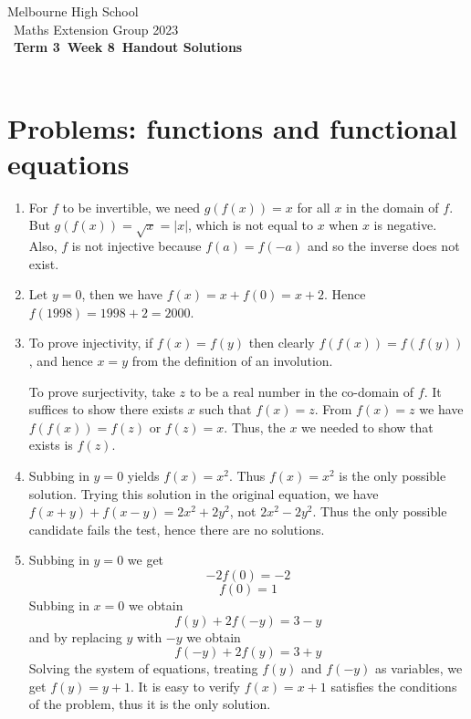 \documentclass[a4paper]{article}
\title{{\thepdftitle}}
\author{Nathan Wong\and Tom Yan}
\date{2023}
\newcommand{\theterm}{3}
\newcommand{\theweek}{8}
\newcommand{\thedisplaytitle}{Term \theterm\ Week \theweek\ Handout Solutions}
\begin{document}
\noindent Melbourne High School\\\
\noindent Maths Extension Group 2023\\\
\noindent \textbf{\thedisplaytitle}\\\
\section*{Problems: functions and functional equations}
\begin{enumerate}
\item For $f$ to be invertible, we need $g(f(x))=x$ for all $x$ in the domain of $f$. But $g(f(x))=\sqrt{x}=|x|$, which is not equal to $x$ when $x$ is negative. Also, $f$ is not injective because $f(a)=f(-a)$ and so the inverse does not exist.
\item Let $y=0$, then we have $f(x)=x+f(0)=x+2$. Hence $f(1998)=1998+2=2000$.
\item To prove injectivity, if $f(x)=f(y)$ then clearly $f(f(x))=f(f(y))$, and hence $x=y$ from the definition of an involution. 

 To prove surjectivity, take $z$ to be a real number in the co-domain of $f$. It suffices to show there exists $x$ such that $f(x)=z$. From $f(x)=z$ we have $f(f(x))=f(z)$ or $f(z)=x$. Thus, the $x$ we needed to show that exists is $f(z)$.
\item Subbing in $y=0$ yields $f(x)=x^2$. Thus $f(x)=x^2$ is the only possible solution. Trying this solution in the original equation, we have $f(x+y)+f(x-y)=2x^2+2y^2$, not $2x^2-2y^2$. Thus the only possible candidate fails the test, hence there are no solutions.
\item Subbing in $y=0$ we get $$-2f(0)=-2$$ $$f(0)=1$$ Subbing in $x=0$ we obtain $$f(y)+2f(-y)=3-y$$ and by replacing $y$ with $-y$ we obtain $$f(-y)+2f(y)=3+y$$ Solving the system of equations, treating $f(y)$ and $f(-y)$ as variables, we get $f(y)=y+1$. It is easy to verify $f(x)=x+1$ satisfies the conditions of the problem, thus it is the only solution. 
\end{enumerate}
\end{document}
